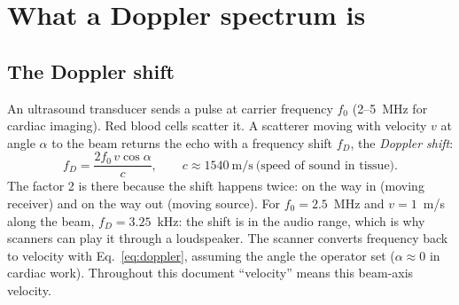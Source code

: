 \documentclass[11pt,a4paper]{article}
\begin{document}
\section{What a Doppler spectrum is}
\label{sec:fund}

\subsection{The Doppler shift}
An ultrasound transducer sends a pulse at carrier frequency $f_0$ (2--5~MHz for cardiac imaging). Red blood cells
scatter it. A scatterer moving with velocity $v$ at angle $\alpha$ to the beam returns the echo with a frequency
shift $f_D$, the \emph{Doppler shift}:
\begin{equation}
f_D = \frac{2 f_0 \, v \cos\alpha}{c}, \qquad c \approx 1540~\mathrm{m/s}\ \text{(speed of sound in tissue)}.
\label{eq:doppler}
\end{equation}
The factor 2 is there because the shift happens twice: on the way in (moving receiver) and on the way out
(moving source). For $f_0 = 2.5$~MHz and $v = 1$~m/s along the beam, $f_D = 3.25$~kHz: the shift is in the audio
range, which is why scanners can play it through a loudspeaker. The scanner converts frequency back to velocity
with Eq.~\eqref{eq:doppler}, assuming the angle the operator set ($\alpha \approx 0$ in cardiac work). Throughout
this document ``velocity'' means this beam-axis velocity.
\end{document}
